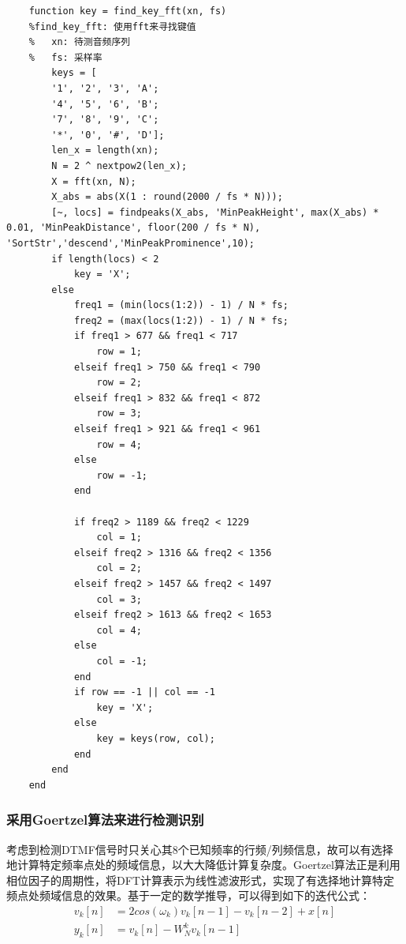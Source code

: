 \documentclass[10pt, a4paper]{article}
\begin{document}
    \begin{lstlisting}
    function key = find_key_fft(xn, fs)
    %find_key_fft: 使用fft来寻找键值
    %   xn: 待测音频序列
    %   fs: 采样率
        keys = [
        '1', '2', '3', 'A';
        '4', '5', '6', 'B';
        '7', '8', '9', 'C';
        '*', '0', '#', 'D'];
        len_x = length(xn);    
        N = 2 ^ nextpow2(len_x);
        X = fft(xn, N);
        X_abs = abs(X(1 : round(2000 / fs * N)));
        [~, locs] = findpeaks(X_abs, 'MinPeakHeight', max(X_abs) * 0.01, 'MinPeakDistance', floor(200 / fs * N), 'SortStr','descend','MinPeakProminence',10);
        if length(locs) < 2
            key = 'X';
        else
            freq1 = (min(locs(1:2)) - 1) / N * fs;
            freq2 = (max(locs(1:2)) - 1) / N * fs;
            if freq1 > 677 && freq1 < 717
                row = 1;
            elseif freq1 > 750 && freq1 < 790
                row = 2;
            elseif freq1 > 832 && freq1 < 872
                row = 3;
            elseif freq1 > 921 && freq1 < 961
                row = 4;
            else
                row = -1;
            end
    
            if freq2 > 1189 && freq2 < 1229
                col = 1;
            elseif freq2 > 1316 && freq2 < 1356
                col = 2;
            elseif freq2 > 1457 && freq2 < 1497
                col = 3;
            elseif freq2 > 1613 && freq2 < 1653
                col = 4;
            else
                col = -1;
            end
            if row == -1 || col == -1
                key = 'X';
            else
                key = keys(row, col);
            end
        end   
    end

    \end{lstlisting}

\subsubsection{采用Goertzel算法来进行检测识别}

    考虑到检测DTMF信号时只关心其8个已知频率的行频/列频信息，故可以有选择地计算特定频率点处的频域信息，以大大降低计算复杂度。Goertzel算法正是利用相位因子的周期性，将DFT计算表示为线性滤波形式，实现了有选择地计算特定频点处频域信息的效果。基于一定的数学推导，可以得到如下的迭代公式：
    \begin{align*}
        v_k[n]&=2cos(\omega_k)v_k[n-1]-v_k[n-2]+x[n] \\
        y_k[n]&=v_k[n]-W_N^k v_k[n-1]
    \end{align*}
    
\end{document}
